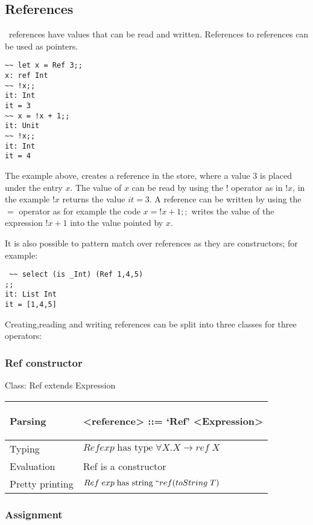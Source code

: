 \documentclass[12pt]{article}
\begin{document}
\subsection{References }
\bondi\ references have values that can be read and written. References to references
can be used as pointers.

\begin{verbatim}
~~ let x = Ref 3;;
x: ref Int
~~ !x;;
it: Int
it = 3
~~ x = !x + 1;;
it: Unit
~~ !x;;
it: Int
it = 4
\end{verbatim}

The example above, creates a reference in the store, where a value $3$ is placed under the entry $x$.
The value of $x$ can be read by using the $!$ operator as in $!x$, in the example
$!x$ returns the value $it = 3$.
A reference can be written by using the $=$ operator as for example
the code $x = !x + 1;;$  writes the value of the expression $!x + 1$ into
the value pointed by $x$.


It is also possible to pattern match over references as they are constructors; for example:

\begin{verbatim}
 ~~ select (is _Int) (Ref 1,4,5)
;;
it: List Int
it = [1,4,5]
\end{verbatim}


Creating,reading and writing references can be split into three classes for three operators:   

\subsubsection{Ref constructor}
Class: Ref extends Expression

\begin{tabular}{|l|p{15cm}|}
\hline
Parsing & \begin{grammar}
<reference> ::= `Ref' <Expression>   
\end{grammar}  \\
\hline
Typing & $Ref exp\; \text{has type} \; \forall X.X \rightarrow ref \;X$
\\
\hline
Evaluation &  Ref is a constructor \\
\hline
Pretty printing & $Ref \; exp\; \text{has string} \;``ref  (toString \; T)$ \\
\hline
\end{tabular} 


\subsubsection{Assignment}
\end{document}
